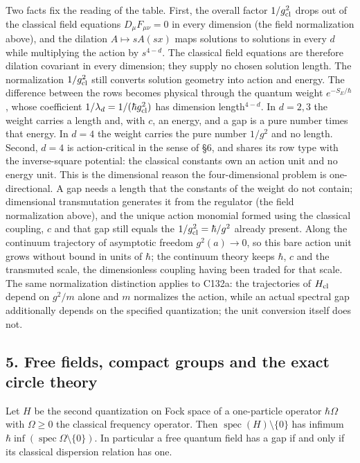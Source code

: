 \documentclass[11pt,a4paper]{article}
\begin{document}
Two facts fix the reading of the table. First, the overall factor
\(1/g_{\rm cl}^2\) drops out of the classical field equations
\(D_\mu F_{\mu\nu}=0\) in every dimension (the field normalization
above), and the dilation \(A\mapsto sA(sx)\) maps solutions to solutions
in every \(d\) while multiplying the action by \(s^{4-d}\). The
classical field equations are therefore dilation covariant in every
dimension; they supply no chosen solution length. The normalization
\(1/g_{\rm cl}^2\) still converts solution geometry into action and
energy. The difference between the rows becomes physical through the
quantum weight \(e^{-S_E/\hbar}\), whose coefficient
\(1/\lambda_d=1/(\hbar g_{\rm cl}^2)\) has dimension length\(^{4-d}\).
In \(d=2,3\) the weight carries a length and, with \(c\), an energy, and
a gap is a pure number times that energy. In \(d=4\) the weight carries
the pure number \(1/g^2\) and no length. Second, \(d=4\) is
action-critical in the sense of §6, and shares its row type with the
inverse-square potential: the classical constants own an action unit and
no energy unit. This is the dimensional reason the four-dimensional
problem is one-directional. A gap needs a length that the constants of
the weight do not contain; dimensional transmutation generates it from
the regulator (the field normalization above), and the unique action
monomial formed using the classical coupling, \(c\) and that gap still
equals the \(1/g_{\rm cl}^2=\hbar/g^2\) already present. Along the
continuum trajectory of asymptotic freedom \(g^2(a)\to0\), so this bare
action unit grows without bound in units of \(\hbar\); the continuum
theory keeps \(\hbar\), \(c\) and the transmuted scale, the
dimensionless coupling having been traded for that scale. The same
normalization distinction applies to C132a: the trajectories of
\(H_{\rm cl}\) depend on \(g^2/m\) alone and \(m\) normalizes the
action, while an actual spectral gap additionally depends on the
specified quantization; the unit conversion itself does not.

\hypertarget{free-fields-compact-groups-and-the-exact-circle-theory}{%
\subsection{5. Free fields, compact groups and the exact circle
theory}\label{free-fields-compact-groups-and-the-exact-circle-theory}}

Let \(H\) be the second quantization on Fock space of a one-particle
operator \(\hbar\Omega\) with \(\Omega\ge0\) the classical frequency
operator. Then \(\operatorname{spec}(H)\setminus\{0\}\) has infimum
\(\hbar\inf(\operatorname{spec}\Omega\setminus\{0\})\). In particular a
free quantum field has a gap if and only if its classical dispersion
relation has one.
\end{document}
